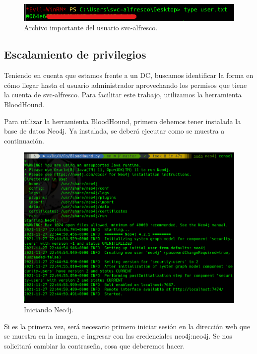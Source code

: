 \documentclass{article}
\begin{document}
\begin{figure}[H]
	\center
	\includegraphics[width=\textwidth]{images/forest/obtenida la hash de alfresco.png}
	\caption{Archivo importante del usuario svc-alfresco.}
\end{figure}


\subsection{Escalamiento de privilegios}

Teniendo en cuenta que estamos frente a un DC, buscamos identificar la forma en cómo llegar hasta el usuario administrador aprovechando los permisos que tiene la cuenta de svc-alfresco. Para facilitar este trabajo, utilizamos la herramienta BloodHound. 

Para utilizar la herramienta BloodHound, primero debemos tener instalada la base de datos Neo4j. Ya instalada, se deberá ejecutar como se muestra a continuación.

\begin{figure}[H]
	\center
	\includegraphics[width=\textwidth]{images/forest/iniciando_neo4j.png}
	\caption{Iniciando Neo4j.}
\end{figure}

Si es la primera vez, será necesario primero iniciar sesión en la dirección web que se muestra en la imagen, e ingresar con las credenciales neo4j:neo4j. Se nos solicitará cambiar la contraseña, cosa que deberemos hacer.
\end{document}
